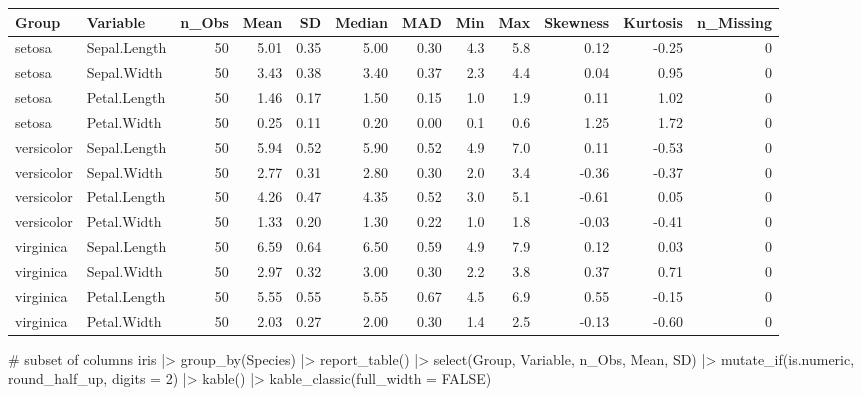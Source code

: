 \documentclass[
  letterpaper,
  DIV=11,
  numbers=noendperiod]{scrreprt}
\newenvironment{Shaded}{\begin{snugshade}}{\end{snugshade}}
\newcommand{\AttributeTok}[1]{\textcolor[rgb]{0.40,0.45,0.13}{#1}}
\newcommand{\CommentTok}[1]{\textcolor[rgb]{0.37,0.37,0.37}{#1}}
\newcommand{\ConstantTok}[1]{\textcolor[rgb]{0.56,0.35,0.01}{#1}}
\newcommand{\DecValTok}[1]{\textcolor[rgb]{0.68,0.00,0.00}{#1}}
\newcommand{\FunctionTok}[1]{\textcolor[rgb]{0.28,0.35,0.67}{#1}}
\newcommand{\NormalTok}[1]{\textcolor[rgb]{0.00,0.23,0.31}{#1}}
\newcommand{\SpecialCharTok}[1]{\textcolor[rgb]{0.37,0.37,0.37}{#1}}
\begin{document}
\begin{longtable*}[t]{llrrrrrrrrrr}
\toprule
Group & Variable & n\_Obs & Mean & SD & Median & MAD & Min & Max & Skewness & Kurtosis & n\_Missing\\
\midrule
setosa & Sepal.Length & 50 & 5.01 & 0.35 & 5.00 & 0.30 & 4.3 & 5.8 & 0.12 & -0.25 & 0\\
setosa & Sepal.Width & 50 & 3.43 & 0.38 & 3.40 & 0.37 & 2.3 & 4.4 & 0.04 & 0.95 & 0\\
setosa & Petal.Length & 50 & 1.46 & 0.17 & 1.50 & 0.15 & 1.0 & 1.9 & 0.11 & 1.02 & 0\\
setosa & Petal.Width & 50 & 0.25 & 0.11 & 0.20 & 0.00 & 0.1 & 0.6 & 1.25 & 1.72 & 0\\
versicolor & Sepal.Length & 50 & 5.94 & 0.52 & 5.90 & 0.52 & 4.9 & 7.0 & 0.11 & -0.53 & 0\\
\addlinespace
versicolor & Sepal.Width & 50 & 2.77 & 0.31 & 2.80 & 0.30 & 2.0 & 3.4 & -0.36 & -0.37 & 0\\
versicolor & Petal.Length & 50 & 4.26 & 0.47 & 4.35 & 0.52 & 3.0 & 5.1 & -0.61 & 0.05 & 0\\
versicolor & Petal.Width & 50 & 1.33 & 0.20 & 1.30 & 0.22 & 1.0 & 1.8 & -0.03 & -0.41 & 0\\
virginica & Sepal.Length & 50 & 6.59 & 0.64 & 6.50 & 0.59 & 4.9 & 7.9 & 0.12 & 0.03 & 0\\
virginica & Sepal.Width & 50 & 2.97 & 0.32 & 3.00 & 0.30 & 2.2 & 3.8 & 0.37 & 0.71 & 0\\
\addlinespace
virginica & Petal.Length & 50 & 5.55 & 0.55 & 5.55 & 0.67 & 4.5 & 6.9 & 0.55 & -0.15 & 0\\
virginica & Petal.Width & 50 & 2.03 & 0.27 & 2.00 & 0.30 & 1.4 & 2.5 & -0.13 & -0.60 & 0\\
\bottomrule
\end{longtable*}

\begin{Shaded}
\begin{Highlighting}[]
\CommentTok{\# subset of columns}
\NormalTok{iris }\SpecialCharTok{|\textgreater{}}
  \FunctionTok{group\_by}\NormalTok{(Species) }\SpecialCharTok{|\textgreater{}}
  \FunctionTok{report\_table}\NormalTok{() }\SpecialCharTok{|\textgreater{}}
  \FunctionTok{select}\NormalTok{(Group, Variable, n\_Obs, Mean, SD) }\SpecialCharTok{|\textgreater{}}
  \FunctionTok{mutate\_if}\NormalTok{(is.numeric, round\_half\_up, }\AttributeTok{digits =} \DecValTok{2}\NormalTok{) }\SpecialCharTok{|\textgreater{}}
  \FunctionTok{kable}\NormalTok{() }\SpecialCharTok{|\textgreater{}}
  \FunctionTok{kable\_classic}\NormalTok{(}\AttributeTok{full\_width =} \ConstantTok{FALSE}\NormalTok{)}
\end{Highlighting}
\end{Shaded}
\end{document}
